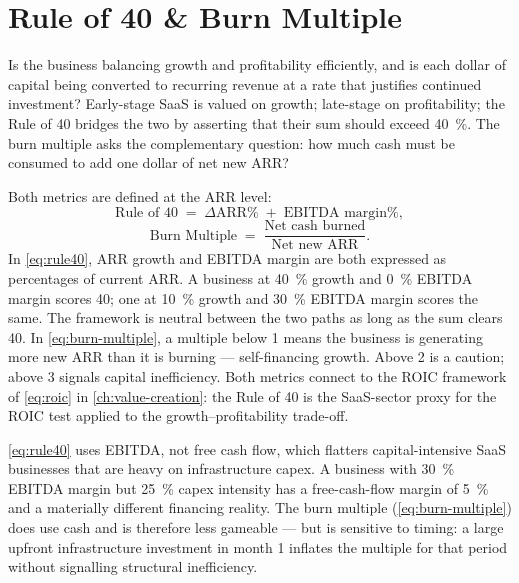 \section{Rule of 40 \& Burn Multiple}\label{sec:rule40-burn}

Is the business balancing growth and profitability efficiently, and is each dollar of capital being converted to recurring revenue at a rate that justifies continued investment? Early-stage SaaS is valued on growth; late-stage on profitability; the Rule of 40 bridges the two by asserting that their sum should exceed \qty{40}{\percent}. The burn multiple asks the complementary question: how much cash must be consumed to add one dollar of net new ARR?

Both metrics are defined at the ARR level:
\begin{equation}\label{eq:rule40}
  \text{Rule of 40} \;=\; \Delta\text{ARR\%} \;+\; \text{EBITDA margin\%},
\end{equation}
\begin{equation}\label{eq:burn-multiple}
  \text{Burn Multiple} \;=\; \frac{\text{Net cash burned}}{\text{Net new ARR}}.
\end{equation}
In \cref{eq:rule40}, ARR growth and EBITDA margin are both expressed as percentages of current ARR. A business at \qty{40}{\percent} growth and \qty{0}{\percent} EBITDA margin scores 40; one at \qty{10}{\percent} growth and \qty{30}{\percent} EBITDA margin scores the same. The framework is neutral between the two paths as long as the sum clears 40. In \cref{eq:burn-multiple}, a multiple below 1 means the business is generating more new ARR than it is burning --- self-financing growth. Above 2 is a caution; above 3 signals capital inefficiency. Both metrics connect to the ROIC framework of \cref{eq:roic} in \cref{ch:value-creation}: the Rule of 40 is the SaaS-sector proxy for the ROIC test applied to the growth--profitability trade-off.

\cref{eq:rule40} uses EBITDA, not free cash flow, which flatters capital-intensive SaaS businesses that are heavy on infrastructure capex. A business with \qty{30}{\percent} EBITDA margin but \qty{25}{\percent} capex intensity has a free-cash-flow margin of \qty{5}{\percent} and a materially different financing reality. The burn multiple (\cref{eq:burn-multiple}) does use cash and is therefore less gameable --- but is sensitive to timing: a large upfront infrastructure investment in month 1 inflates the multiple for that period without signalling structural inefficiency.

